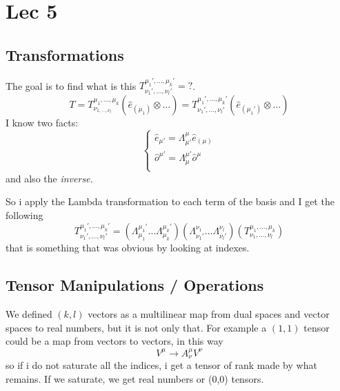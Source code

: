 \section{Lec 5}
\subsection{Transformations}
The goal is to find what is this $T^{\mu_{1}', \ldots , \mu_{k}'}_{\nu_{1}', \ldots , \nu_{l}'}= ?$.
\begin{equation}
T = T^{\mu_{1}, \ldots , \mu_{k}}_{\nu_{1, \ldots , \nu_{l}}} \left( \hat{e}_{\left( \mu_{1} \right)} \otimes \ldots  \right) = T^{\mu_{1}', \ldots , \mu_{k}'}_{\nu_{1}', \ldots , \nu_{l}'} \left( \hat{e}_{\left( \mu_{1}' \right)} \otimes \ldots  \right)
\end{equation}
I know two facts:
\begin{equation}
\begin{cases}
\hat{e}_{\mu '} = \Lambda^{\mu }_{\mu '} \hat{e}_{\left( \mu  \right)} \\
\hat{o}^{\mu '} = \Lambda^{\mu' }_{\mu } \hat{o}^{\mu } \\
\end{cases}
\end{equation}
and also the \emph{inverse.} \par

So i apply the Lambda transformation to each term of the basis and I get the following
\begin{equation}
T^{\mu_{1}', \ldots , \mu_{k}'}_{\nu_{1}', \ldots , \nu_{l}' } = \left( \Lambda^{\mu_{1}'}_{\mu_{1}} \ldots \Lambda^{\mu_{k}'}_{\mu_{k}} \right) \left( \Lambda^{\nu_{1}}_{\nu_{1}'} \ldots  \Lambda^{\nu_{l}}_{\nu_{l}'} \right) \left( T^{\mu_{1}, \ldots , \mu_{k}}_{\nu_{1}, \ldots , \nu_{l}} \right)
\end{equation}
that is something that was obvious by looking at indexes.

\subsection{Tensor Manipulations / Operations}
We defined $\left( k,l \right)$ vectors as a multilinear map from dual spaces and vector spaces to real numbers, but it is not only that. For example a $\left( 1,1 \right)$ tensor could be a map from vectors to vectors, in this way
\begin{equation}
V^{\mu } \to A^{\mu }_{\nu } V^{\nu }
\end{equation}
so if i do not saturate all the indices, i get a tensor of rank made by what remains. If we saturate, we get real numbers or (0,0) tensors.

